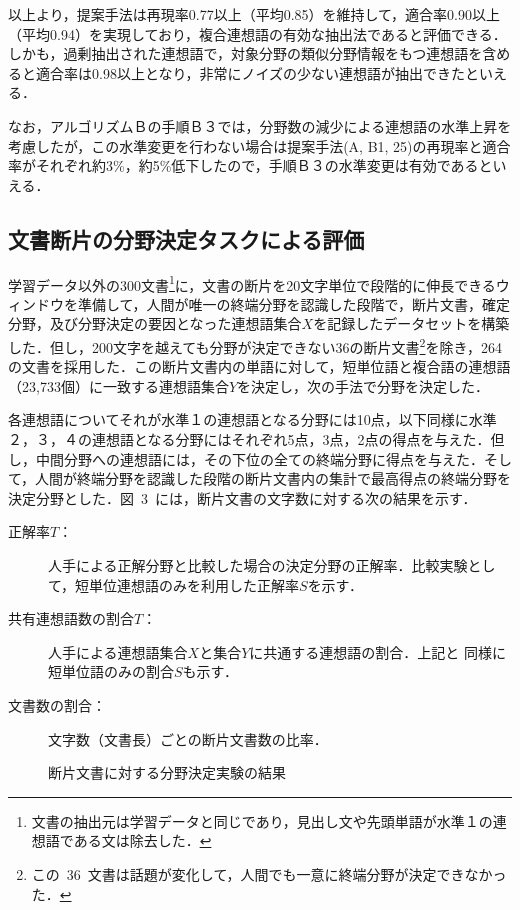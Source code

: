 以上より，提案手法は再現率0.77以上（平均0.85）を維持して，適合率0.90以上（平均0.94）を実現しており，複合連想語の有効な抽出法であると評価できる．しかも，過剰抽出された連想語で，対象分野の類似分野情報をもつ連想語を含めると適合率は0.98以上となり，非常にノイズの少ない連想語が抽出できたといえる．

なお，アルゴリズムＢの手順Ｂ３では，分野数の減少による連想語の水準上昇を考慮したが，この水準変更を行わない場合は提案手法(A, B1, 25)の再現率と適合率がそれぞれ約3\%，約5\%低下したので，手順Ｂ３の水準変更は有効であるといえる．

\subsection{文書断片の分野決定タスクによる評価}

学習データ以外の300文書\footnote{文書の抽出元は学習データと同じであり，見出し文や先頭単語が水準１の連想語である文は除去した．}に，文書の断片を20文字単位で段階的に伸長できるウィンドウを準備して，人間が唯一の終端分野を認識した段階で，断片文書，確定分野，及び分野決定の要因となった連想語集合$X$を記録したデータセットを構築した．但し，200文字を越えても分野が決定できない36の断片文書\footnote{この~36~文書は話題が変化して，人間でも一意に終端分野が決定できなかった．}を除き，264の文書を採用した．この断片文書内の単語に対して，短単位語と複合語の連想語（23,733個）に一致する連想語集合$Y$を決定し，次の手法で分野を決定した．

各連想語についてそれが水準１の連想語となる分野には10点，以下同様に水準２，３，４の連想語となる分野にはそれぞれ5点，3点，2点の得点を与えた．但し，中間分野への連想語には，その下位の全ての終端分野に得点を与えた．そして，人間が終端分野を認識した段階の断片文書内の集計で最高得点の終端分野を決定分野とした．図~3~には，断片文書の文字数に対する次の結果を示す．
\begin{description}
\item[正解率$T$：] 人手による正解分野と比較した場合の決定分野の正解率．比較実験として，短単位連想語のみを利用した正解率$S$を示す．
\item[共有連想語数の割合$T$：] 人手による連想語集合$X$と集合$Y$に共通する連想語の割合．上記と\break
同様に短単位語のみの割合$S$も示す．
\item[文書数の割合：] 文字数（文書長）ごとの断片文書数の比率．
\end{description}

\begin{figure}[t]
  \begin{center}
  \end{center}
  \caption{断片文書に対する分野決定実験の結果}
\end{figure}


